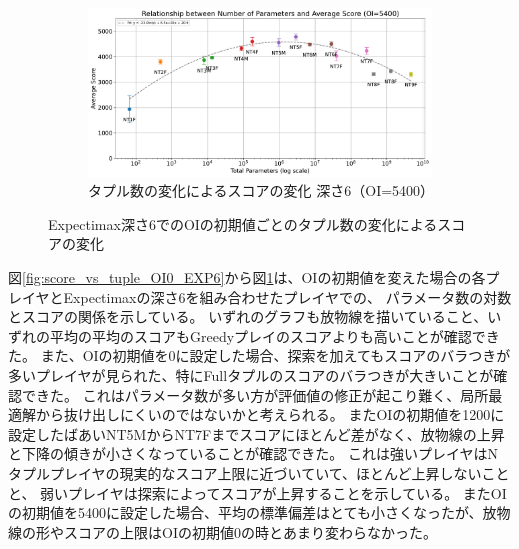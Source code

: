 \begin{figure}[t]
    \vspace{1em}
    \begin{subfigure}[b]{\linewidth}
        \centering
        \includegraphics[width=\linewidth]{pdf/parameter_performance_plots/params_performance_OI5400_EXP6.pdf}
        \caption{タプル数の変化によるスコアの変化 深さ6（OI=5400）}
        \label{fig:score_vs_tuple_OI5400_EXP6}
    \end{subfigure}

    \caption{Expectimax深さ6でのOIの初期値ごとのタプル数の変化によるスコアの変化}
    \label{fig:score_vs_tuple_all_EXP6}
\end{figure}

図\ref{fig:score_vs_tuple_OI0_EXP6}から図\ref{fig:score_vs_tuple_OI5400_EXP6}は、OIの初期値を変えた場合の各プレイヤとExpectimaxの深さ6を組み合わせたプレイヤでの、
パラメータ数の対数とスコアの関係を示している。
いずれのグラフも放物線を描いていること、いずれの平均の平均のスコアもGreedyプレイのスコアよりも高いことが確認できた。
また、OIの初期値を0に設定した場合、探索を加えてもスコアのバラつきが多いプレイヤが見られた、特にFullタプルのスコアのバラつきが大きいことが確認できた。
これはパラメータ数が多い方が評価値の修正が起こり難く、局所最適解から抜け出しにくいのではないかと考えられる。
またOIの初期値を1200に設定したばあいNT5MからNT7Fまでスコアにほとんど差がなく、放物線の上昇と下降の傾きが小さくなっていることが確認できた。
これは強いプレイヤはNタプルプレイヤの現実的なスコア上限に近づいていて、ほとんど上昇しないことと、
弱いプレイヤは探索によってスコアが上昇することを示している。
またOIの初期値を5400に設定した場合、平均の標準偏差はとても小さくなったが、放物線の形やスコアの上限はOIの初期値0の時とあまり変わらなかった。

